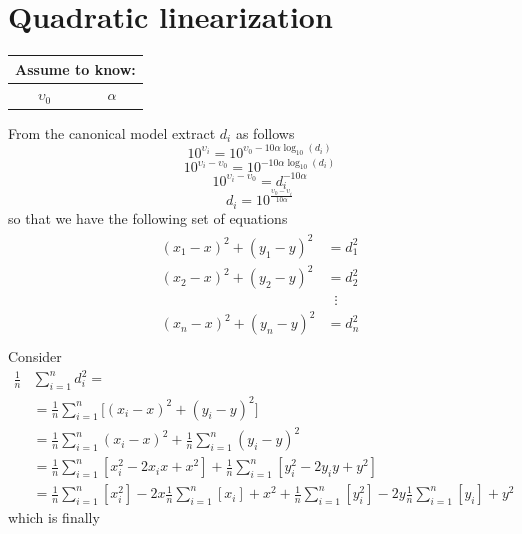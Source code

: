 \documentclass[12pt]{report}
\begin{document}
\section{Quadratic linearization}
  \begin{center}
    \begin{tabular}{ |c|c| } 
    \hline
    \multicolumn{2}{|c|}{ \textbf{Assume to know:} } \\
    \hline
    $\upsilon_0$ & $\alpha$ \\
    \hline
    \end{tabular}
\end{center}
From the canonical model extract $d_i$ as follows
\begin{equation*}
    10^{\upsilon_{i}}=10^{\upsilon_0-10\alpha\log_{10}(d_i)}
\end{equation*}
\begin{equation*}
    10^{\upsilon_{i}-\upsilon_0}=10^{-10\alpha\log_{10}(d_i)}
\end{equation*}
\begin{equation*}
     10^{\upsilon_{i}-\upsilon_0}=d_i^{-10\alpha}
\end{equation*}
\begin{equation}
    d_i=10^{\frac{\upsilon_0-\upsilon_{i}}{10\alpha}}
    \label{eq:17}
\end{equation}
so that we have the following set of equations
\begin{align}
\begin{split} 
(x_1-x)^2+(y_1-y)^2&=d_1^2 \\ 
(x_2-x)^2+(y_2-y)^2&=d_2^2 \\ 
&\;\;\vdots\\
(x_n-x)^2+(y_n-y)^2&=d_n^2 \\
\end{split}
\label{eq:11}
\end{align}
Consider 
\begin{align}
\frac{1}{n}&\sum_{i=1}^nd_i^2=\\
&=\frac{1}{n}\sum_{i=1}^n\big[(x_i-x)^2+(y_i-y)^2\big]\\
&=\frac{1}{n}\sum_{i=1}^n(x_i-x)^2+\frac{1}{n}\sum_{i=1}^n(y_i-y)^2\\
&=\frac{1}{n}\sum_{i=1}^n[x_i^2-2x_ix+x^2] + \frac{1}{n}\sum_{i=1}^n[y_i^2-2y_iy+y^2]\\
&=\frac{1}{n}\sum_{i=1}^n[x_i^2]-2x\frac{1}{n}\sum_{i=1}^n[x_i]+ x^2 + \frac{1}{n}\sum_{i=1}^n[y_i^2]-2y\frac{1}{n}\sum_{i=1}^n[y_i]+ y^2
\end{align}
which is finally
\end{document}
